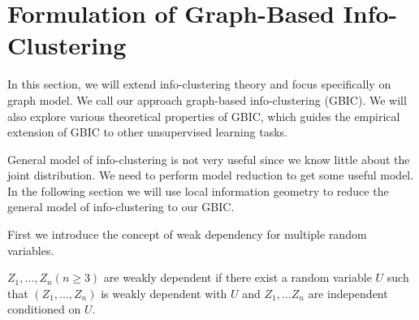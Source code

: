 \section{Formulation of Graph-Based Info-Clustering}\label{sec:GBIC}

In this section, we will extend info-clustering theory and focus specifically on graph model. We call our approach graph-based info-clustering (GBIC).
We will also explore various theoretical
properties of GBIC, which guides the empirical extension of GBIC to other unsupervised learning tasks.

General model of info-clustering is not very useful since we know little about the joint distribution.
We need to perform model reduction to get some useful model. 
In the following section we will use local information geometry to reduce the general model of info-clustering to our GBIC.



First we introduce the concept of weak dependency for multiple random variables.

\begin{definition}\label{def:general}
$Z_1, \dots, Z_n (n\geq 3)$ are weakly dependent if there exist a random variable $U$ such that
$(Z_1, \dots, Z_n)$ is weakly dependent with $U$ and $Z_1, \dots Z_n$ are independent conditioned
on $U$.
\end{definition}

